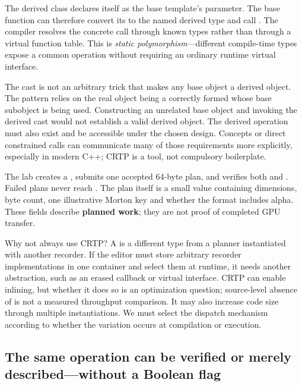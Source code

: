 The derived class declares itself as the base template's parameter. The base function can therefore convert its  to the named derived type and call . The compiler resolves the concrete call through known types rather than through a virtual function table. This is \emph{static polymorphism}---different compile-time types expose a common operation without requiring an ordinary runtime virtual interface.

The cast is not an arbitrary trick that makes any base object a derived object. The pattern relies on the real object being a correctly formed  whose  base subobject is being used. Constructing an unrelated base object and invoking the derived cast would not establish a valid derived object. The derived operation must also exist and be accessible under the chosen design. Concepts or direct constrained calls can communicate many of those requirements more explicitly, especially in modern C++; CRTP is a tool, not compulsory boilerplate.

The lab creates a , submits one accepted 64-byte plan, and verifies both  and . Failed plans never reach . The plan itself is a small value containing dimensions, byte count, one illustrative Morton key and whether the format includes alpha. These fields describe \textbf{planned work}; they are not proof of completed GPU transfer.

Why not always use CRTP? A  is a different type from a planner instantiated with another recorder. If the editor must store arbitrary recorder implementations in one container and select them at runtime, it needs another abstraction, such as an erased callback or virtual interface. CRTP can enable inlining, but whether it does so is an optimization question; source-level absence of  is not a measured throughput comparison. It may also increase code size through multiple instantiations. We must select the dispatch mechanism according to whether the variation occurs at compilation or execution.

\subsection{The same operation can be verified or merely described---without a Boolean flag}\label{01-foundations-i-ch005-the-same-operation-can-be-verified-or-merely-describedwithout-a-boolean-flag}

